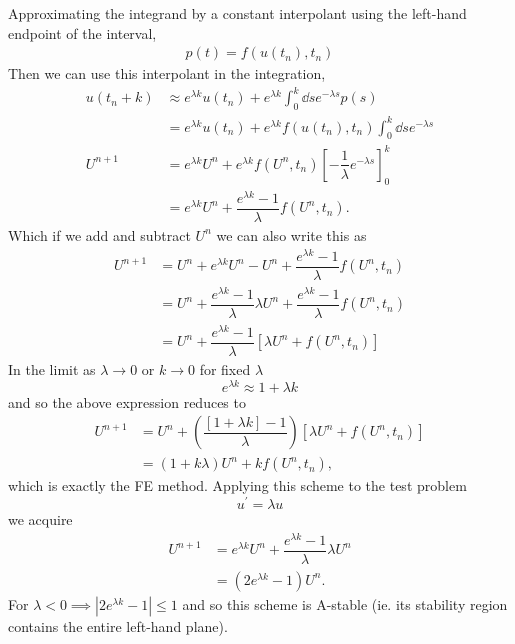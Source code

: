 \documentclass[12pt]{article}
\begin{document}
Approximating the integrand by a constant interpolant using the left-hand endpoint of the interval,
\begin{align}
    p(t) = f(u(t_{n}), t_{n})
\end{align} 
Then we can use this interpolant in the integration,
\begin{subequations}
    \begin{align}
        u(t_{n}+k) &\approx e^{\lambda k} u(t_{n}) + e^{\lambda k}\int_{0}^{k}\dd{s} e^{-\lambda s}p(s)\\
        &= e^{\lambda k} u(t_{n}) + e^{\lambda k}f(u(t_{n}), t_{n})\int_{0}^{k}\dd{s} e^{-\lambda s}\\
        U^{n+1} &= e^{\lambda k} U^{n} + e^{\lambda k}f(U^{n}, t_{n})\left[-\dfrac{1}{\lambda}e^{-\lambda s}\right]_{0}^{k}\\
        &= e^{\lambda k} U^{n} + \dfrac{e^{\lambda k}-1}{\lambda}f(U^{n}, t_{n}).
    \end{align}
\end{subequations}
Which if we add and subtract $U^{n}$ we can also write this as 
\begin{subequations}
    \begin{align}
        U^{n+1} &= U^{n} + e^{\lambda k} U^{n} - U^{n} + \dfrac{e^{\lambda k}-1}{\lambda}f(U^{n}, t_{n})\\
        &= U^{n} + \dfrac{e^{\lambda k}-1}{\lambda} \lambda U^{n} + \dfrac{e^{\lambda k}-1}{\lambda}f(U^{n}, t_{n})\\
        &= U^{n} + \dfrac{e^{\lambda k}-1}{\lambda}\left[\lambda U^{n} + f(U^{n},t_{n})\right]
    \end{align}
\end{subequations}
In the limit as $\lambda \to 0$ or $k\to 0$ for fixed $\lambda$ \[e^{\lambda k}\approx 1+\lambda k\] and so the above expression reduces to
\begin{subequations}
    \begin{align}
    U^{n+1} &= U^{n} + \left(\dfrac{\left[1+\lambda k\right] - 1}{\lambda}\right)\left[\lambda U^{n} + f(U^{n},t_{n})\right]\\
    &= (1+k\lambda) U^{n} + kf(U^{n},t_{n}),
    \end{align}
\end{subequations}
which is exactly the FE method. Applying this scheme to the test problem \[u^{\prime} = \lambda u\] we acquire
\begin{subequations}
    \begin{align}
        U^{n+1} &= e^{\lambda k} U^{n} + \dfrac{e^{\lambda k}-1}{\lambda}\lambda U^{n}\\
        &= \left(2e^{\lambda k}-1\right)U^{n}.
    \end{align}
\end{subequations}
For $\lambda < 0 \implies |2e^{\lambda k} -1| \le 1$ and so this scheme is A-stable (ie. its stability region contains the entire left-hand plane).
\end{document}
